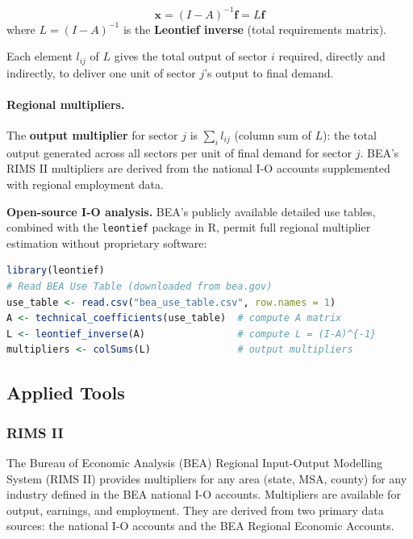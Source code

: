 \begin{tcolorbox}[keyresult]
\begin{equation}
  \mathbf{x} = (I - A)^{-1}\mathbf{f} = L\mathbf{f}
\end{equation}
where $L = (I-A)^{-1}$ is the \textbf{Leontief inverse} (total requirements matrix).
\end{tcolorbox}

Each element $l_{ij}$ of $L$ gives the total output of sector $i$ required,
directly and indirectly, to deliver one unit of sector $j$'s output to
final demand.

\paragraph{Regional multipliers.}

The \textbf{output multiplier} for sector $j$ is $\sum_i l_{ij}$ (column
sum of $L$): the total output generated across all sectors per unit of
final demand for sector $j$. BEA's RIMS II
multipliers are derived from the national I-O
accounts supplemented with regional employment data.

\noindent\textbf{Open-source I-O analysis.} BEA's publicly available
detailed use tables, combined with the \texttt{leontief} package in R,
permit full regional multiplier estimation without proprietary software:

\begin{lstlisting}[language=R, caption={Open I-O analysis with BEA data}]
library(leontief)
# Read BEA Use Table (downloaded from bea.gov)
use_table <- read.csv("bea_use_table.csv", row.names = 1)
A <- technical_coefficients(use_table)  # compute A matrix
L <- leontief_inverse(A)                # compute L = (I-A)^{-1}
multipliers <- colSums(L)               # output multipliers
\end{lstlisting}

\subsection{Applied Tools}
\label{subsec_AppliedIO}

\subsubsection{RIMS II}

The Bureau of Economic Analysis (BEA) Regional Input-Output Modelling System
(RIMS II) provides multipliers for any area (state, MSA, county) for any
industry defined in the BEA national I-O accounts. Multipliers are available
for output, earnings, and employment. They are derived from two primary data
sources: the national I-O accounts and the BEA Regional Economic Accounts.

